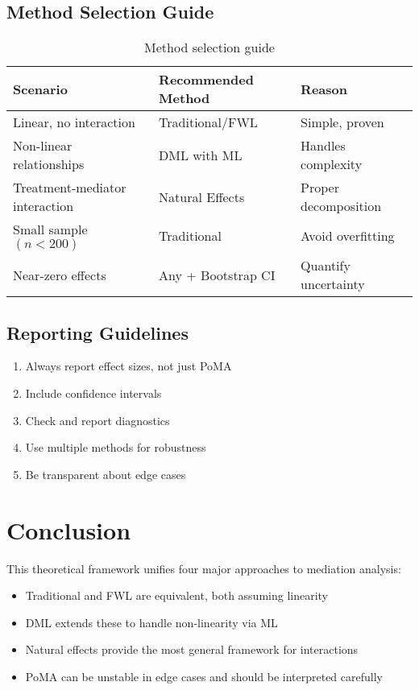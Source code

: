 \documentclass[11pt,a4paper]{article}
\begin{document}
\subsection{Method Selection Guide}

\begin{table}[h]
\centering
\begin{tabular}{lll}
\toprule
Scenario & Recommended Method & Reason \\
\midrule
Linear, no interaction & Traditional/FWL & Simple, proven \\
Non-linear relationships & DML with ML & Handles complexity \\
Treatment-mediator interaction & Natural Effects & Proper decomposition \\
Small sample $(n < 200)$ & Traditional & Avoid overfitting \\
Near-zero effects & Any + Bootstrap CI & Quantify uncertainty \\
\bottomrule
\end{tabular}
\caption{Method selection guide}
\end{table}

\subsection{Reporting Guidelines}

\begin{enumerate}
    \item Always report effect sizes, not just PoMA
    \item Include confidence intervals
    \item Check and report diagnostics
    \item Use multiple methods for robustness
    \item Be transparent about edge cases
\end{enumerate}

\section{Conclusion}

This theoretical framework unifies four major approaches to mediation analysis:
\begin{itemize}
    \item Traditional and FWL are equivalent, both assuming linearity
    \item DML extends these to handle non-linearity via ML
    \item Natural effects provide the most general framework for interactions
    \item PoMA can be unstable in edge cases and should be interpreted carefully
\end{itemize}
\end{document}
